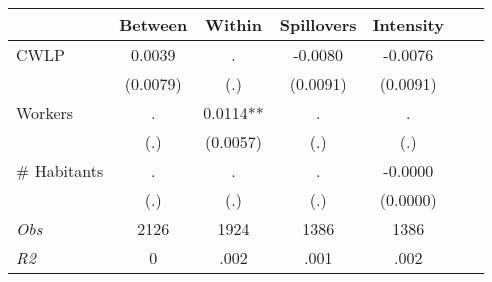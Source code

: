\begin{tabular}{l*{6}{c}}\hline&\multicolumn{1}{c}{Between}&\multicolumn{1}{c}{Within}&\multicolumn{1}{c}{Spillovers}&\multicolumn{1}{c}{Intensity}\\ \hline 
CWLP & 0.0039 & . & -0.0080 & -0.0076 \\
 & (0.0079) & (.) & (0.0091) & (0.0091) \\
Workers & . & 0.0114** & . & . \\
 & (.) & (0.0057) & (.) & (.) \\
\# Habitants & . & . & . & -0.0000 \\
  & (.) & (.) & (.) & (0.0000) \\
\hline \textit{Obs} & 2126 & 1924 & 1386 & 1386  \\ \textit{R2} & 0 & .002 & .001 & .002 \\ \hline \end{tabular}
